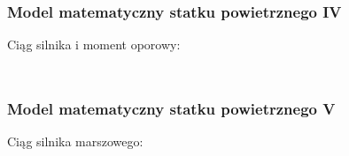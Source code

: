 \documentclass[aspectratio=169]{beamer}
\begin{document}
\begin{frame}%
	\frametitle{Model matematyczny statku powietrznego IV}
	Ciąg silnika i moment oporowy:
	\begin{columns}[T]
		\begin{column}{0.5\textwidth}
	   	 	\begin{figure}
	   		 \centering
	    		\end{figure}
		\end{column}
		\begin{column}{0.5\textwidth}
	   	 	\begin{figure}
	   		 \centering
	    		\end{figure}
		\end{column}
	\end{columns}
\end{frame}

\begin{frame}%
	\frametitle{Model matematyczny statku powietrznego V}
	Ciąg silnika marszowego:
	   	 	\begin{figure}
	   		 \centering
	    		\end{figure}
\end{frame}
\end{document}

